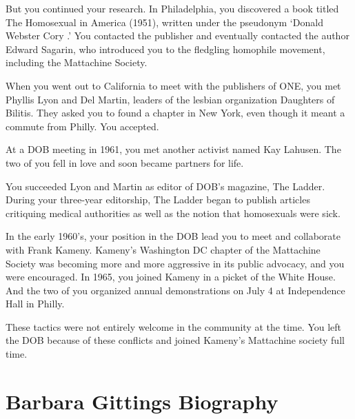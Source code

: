 \begin{refsection}
But you continued your research. In Philadelphia, you discovered a book titled The Homosexual in America (1951), written under the pseudonym `Donald Webster Cory .' You contacted the publisher and eventually contacted the author Edward Sagarin, who introduced you to the fledgling homophile movement, including the Mattachine Society.

When you went out to California to meet with the publishers of ONE, you met Phyllis Lyon and Del Martin, leaders of the lesbian organization Daughters of Bilitis. They asked you to found a chapter in New York, even though it meant a commute from Philly. You accepted. 

At a DOB meeting in 1961, you met another activist named Kay Lahusen. The two of you fell in love and soon became partners for life.

You succeeded Lyon and Martin as editor of DOB's magazine, The Ladder. During your three-year editorship, The Ladder began to publish articles critiquing medical authorities as well as the notion that homosexuals were sick.

In the early 1960's, your position in the DOB lead you to meet and collaborate with Frank Kameny. Kameny's Washington DC chapter of the Mattachine Society was becoming more and more aggressive in its public advocacy, and you were encouraged. In 1965, you joined Kameny in a picket of the White House. And the two of you organized annual demonstrations on July 4 at Independence Hall in Philly.

These tactics were not entirely welcome in the community at the time. You left the DOB because of these conflicts and joined Kameny's Mattachine society full time.

\section{Barbara Gittings Biography}
\label{barbaragittingsbiography}


\end{refsection}
